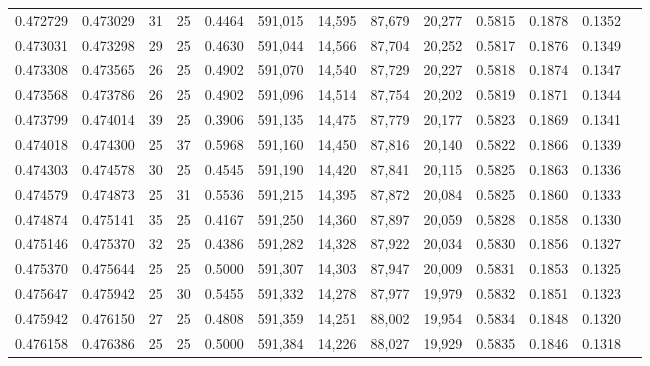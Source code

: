\begin{tabular}{rrrrrrrrrrrrr}
0.472729 & 0.473029 &    31 &  25 &                                     0.4464 & 591,015 &  14,595 &  87,679 &  20,277 & 0.5815 & 0.1878 & 0.1352 \\
0.473031 & 0.473298 &    29 &  25 &                                     0.4630 & 591,044 &  14,566 &  87,704 &  20,252 & 0.5817 & 0.1876 & 0.1349 \\
0.473308 & 0.473565 &    26 &  25 &                                     0.4902 & 591,070 &  14,540 &  87,729 &  20,227 & 0.5818 & 0.1874 & 0.1347 \\
0.473568 & 0.473786 &    26 &  25 &                                     0.4902 & 591,096 &  14,514 &  87,754 &  20,202 & 0.5819 & 0.1871 & 0.1344 \\
0.473799 & 0.474014 &    39 &  25 &                                     0.3906 & 591,135 &  14,475 &  87,779 &  20,177 & 0.5823 & 0.1869 & 0.1341 \\
0.474018 & 0.474300 &    25 &  37 &                                     0.5968 & 591,160 &  14,450 &  87,816 &  20,140 & 0.5822 & 0.1866 & 0.1339 \\
0.474303 & 0.474578 &    30 &  25 &                                     0.4545 & 591,190 &  14,420 &  87,841 &  20,115 & 0.5825 & 0.1863 & 0.1336 \\
0.474579 & 0.474873 &    25 &  31 &                                     0.5536 & 591,215 &  14,395 &  87,872 &  20,084 & 0.5825 & 0.1860 & 0.1333 \\
0.474874 & 0.475141 &    35 &  25 &                                     0.4167 & 591,250 &  14,360 &  87,897 &  20,059 & 0.5828 & 0.1858 & 0.1330 \\
0.475146 & 0.475370 &    32 &  25 &                                     0.4386 & 591,282 &  14,328 &  87,922 &  20,034 & 0.5830 & 0.1856 & 0.1327 \\
0.475370 & 0.475644 &    25 &  25 &                                     0.5000 & 591,307 &  14,303 &  87,947 &  20,009 & 0.5831 & 0.1853 & 0.1325 \\
0.475647 & 0.475942 &    25 &  30 &                                     0.5455 & 591,332 &  14,278 &  87,977 &  19,979 & 0.5832 & 0.1851 & 0.1323 \\
0.475942 & 0.476150 &    27 &  25 &                                     0.4808 & 591,359 &  14,251 &  88,002 &  19,954 & 0.5834 & 0.1848 & 0.1320 \\
0.476158 & 0.476386 &    25 &  25 &                                     0.5000 & 591,384 &  14,226 &  88,027 &  19,929 & 0.5835 & 0.1846 & 0.1318 \\

\end{tabular}
